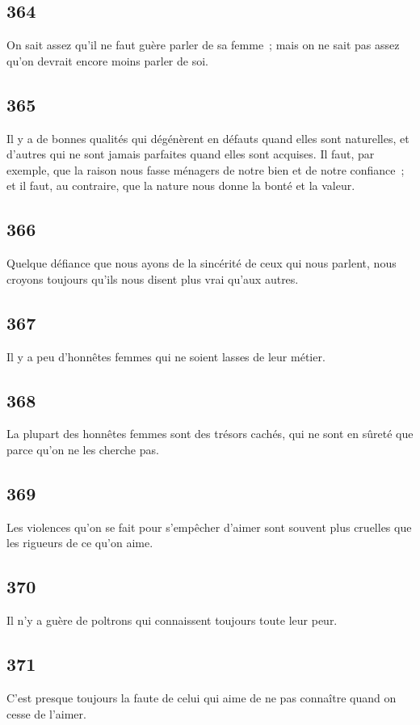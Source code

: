 \documentclass[french,twoside]{book} %
\begin{document}
\subsection[{364}]{ \textsc{364} }
\noindent On sait assez qu’il ne faut guère parler de sa femme ; mais on ne sait pas assez qu’on devrait encore moins parler de soi.
\subsection[{365}]{ \textsc{365} }
\noindent Il y a de bonnes qualités qui dégénèrent en défauts quand elles sont naturelles, et d’autres qui ne sont jamais parfaites quand elles sont acquises. Il faut, par exemple, que la raison nous fasse ménagers de notre bien et de notre confiance ; et il faut, au contraire, que la nature nous donne la bonté et la valeur.
\subsection[{366}]{ \textsc{366} }
\noindent Quelque défiance que nous ayons de la sincérité de ceux qui nous parlent, nous croyons toujours qu’ils nous disent plus vrai qu’aux autres.
\subsection[{367}]{ \textsc{367} }
\noindent Il y a peu d’honnêtes femmes qui ne soient lasses de leur métier.
\subsection[{368}]{ \textsc{368} }
\noindent La plupart des honnêtes femmes sont des trésors cachés, qui ne sont en sûreté que parce qu’on ne les cherche pas.
\subsection[{369}]{ \textsc{369} }
\noindent Les violences qu’on se fait pour s’empêcher d’aimer sont souvent plus cruelles que les rigueurs de ce qu’on aime.
\subsection[{370}]{ \textsc{370} }
\noindent Il n’y a guère de poltrons qui connaissent toujours toute leur peur.
\subsection[{371}]{ \textsc{371} }
\noindent C’est presque toujours la faute de celui qui aime de ne pas connaître quand on cesse de l’aimer.
\end{document}
